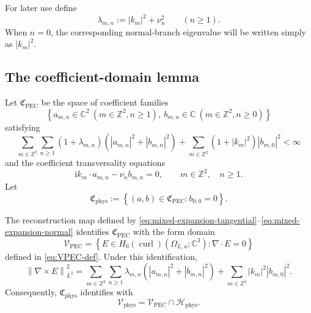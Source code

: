 \documentclass[11pt]{article}
\providecommand{\C}{\mathbb{C}}
\providecommand{\Z}{\mathbb{Z}}
\providecommand{\ii}{\mathrm{i}}
\providecommand{\abs}[1]{\left\lvert #1\right\rvert}
\providecommand{\norm}[1]{\left\lVert #1\right\rVert}
\providecommand{\set}[1]{\left\{#1\right\}}
\providecommand{\paren}[1]{\left(#1\right)}
\providecommand{\OmegaLa}{\Omega_{L,a}}
\providecommand{\Hphys}{\mathcal H_{\mathrm{phys}}}
\providecommand{\VPEC}{\mathcal V_{\mathrm{PEC}}}
\providecommand{\Vphys}{\mathcal V_{\mathrm{phys}}}
\providecommand{\Hzcurl}{H_0(\operatorname{curl})}
\numberwithin{equation}{section}
\begin{document}
For later use define
\begin{equation}
\label{eq:lambda-mn-def}
    \lambda_{m,n}:=\abs{k_m}^2+\nu_n^2
    \qquad(n\ge1).
\end{equation}
When \(n=0\), the corresponding normal-branch eigenvalue will be written simply as \(\abs{k_m}^2\).

\subsection{The coefficient-domain lemma}
\label{subsec:coefficient-domain-lemma}

Let \(\mathfrak C_{\mathrm{PEC}}\) be the space of coefficient families
\[
    \set{a_{m,n}\in\C^2\ (m\in\Z^2,n\ge1),
          \ b_{m,n}\in\C\ (m\in\Z^2,n\ge0)}
\]
satisfying
\begin{equation}
\label{eq:CPEC-weighted-summability}
    \sum_{m\in\Z^2}\sum_{n\ge1}
    (1+\lambda_{m,n})
    \paren{\abs{a_{m,n}}^2+\abs{b_{m,n}}^2}
    +
    \sum_{m\in\Z^2}(1+\abs{k_m}^2)\abs{b_{m,0}}^2
    <\infty
\end{equation}
and the coefficient transversality equations
\begin{equation}
\label{eq:coefficient-divergence-constraint}
    \ii k_m\cdot a_{m,n}-\nu_n b_{m,n}=0,
    \qquad
    m\in\Z^2,
    \quad n\ge1 .
\end{equation}
Let
\begin{equation}
\label{eq:Cphys-def}
    \mathfrak C_{\mathrm{phys}}
    :=
    \set{(a,b)\in\mathfrak C_{\mathrm{PEC}}: b_{0,0}=0} .
\end{equation}

\begin{lemma}
\label{lem:fourier-characterization-VPEC}
The reconstruction map defined by \eqref{eq:mixed-expansion-tangential}--\eqref{eq:mixed-expansion-normal} identifies \(\mathfrak C_{\mathrm{PEC}}\) with the form domain
\[
    \VPEC
    =
    \set{E\in\Hzcurl(\OmegaLa;\C^3):\nabla\cdot E=0}
\]
defined in \eqref{eq:VPEC-def}.  Under this identification,
\begin{equation}
\label{eq:curl-norm-diagonal}
    \norm{\nabla\times E}_{L^2}^2
    =
    \sum_{m\in\Z^2}\sum_{n\ge1}
    \lambda_{m,n}
    \paren{\abs{a_{m,n}}^2+\abs{b_{m,n}}^2}
    +
    \sum_{m\in\Z^2}\abs{k_m}^2\abs{b_{m,0}}^2 .
\end{equation}
Consequently, \(\mathfrak C_{\mathrm{phys}}\) identifies with
\[
    \Vphys=\VPEC\cap\Hphys .
\]
\end{lemma}
\end{document}
